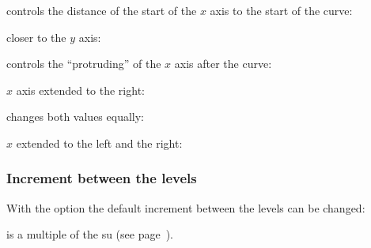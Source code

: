 \documentclass[load-preamble+]{cnltx-doc}
\begin{document}
 controls the distance of the start of the $x$ axis to the
start of the curve:
\begin{example}
  closer to the $y$ axis:\par
  \begin{endiagram}[l-offset=-1]
  \end{endiagram}
\end{example}

 controls the ``protruding'' of the $x$ axis after the curve:
\begin{example}
  $x$ axis extended to the right:\par
  \begin{endiagram}[r-offset=1]
  \end{endiagram}
\end{example}

 changes both values equally:
\begin{example}
  $x$ extended to the left and the right:\par
  \begin{endiagram}[offset=1]
  \end{endiagram}
\end{example}

\subsubsection{Increment between the levels}

With the option  the default increment between the levels can be
changed:
\begin{options}
     is a multiple of the \ac{su} (see page~\pageref{key:unit}).
\end{options}

\begin{example}
  \begin{endiagram}
  \end{endiagram}
  \quad
  \begin{endiagram}
  \end{endiagram}
\end{example}
\end{document}
